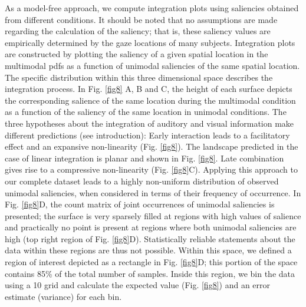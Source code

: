 As a model-free approach, we compute integration plots using saliencies
obtained from different conditions. It should be noted that no assumptions
are made regarding the calculation of the saliency; that is, these saliency
values are empirically determined by the gaze locations of many subjects.
Integration plots are constructed by plotting the saliency of a given
spatial location in the multimodal pdfs as a function of unimodal
saliencies of the same spatial location. The specific distribution within
this three dimensional space describes the integration process. In
Fig. \ref{fig8} A, B and C, the height of each surface depicts the corresponding
salience of the same location during the multimodal condition as a function
of the saliency of the same location in unimodal conditions. The three
hypotheses about the integration of auditory and visual information make
different predictions (see introduction): Early interaction leads to a
facilitatory effect and an expansive non-linearity (Fig. \ref{fig8}). The
landscape predicted in the case of linear integration is planar and shown
in Fig. \ref{fig8}. Late combination gives rise to a compressive non-linearity
(Fig. \ref{fig8}C). Applying this approach to our complete dataset leads to a
highly non-uniform distribution of observed unimodal saliencies, when
considered in terms of their frequency of occurrence. In Fig. \ref{fig8}D, the
count matrix of joint occurrences of unimodal saliencies is presented; the
surface is very sparsely filled at regions with high values of salience and
practically no point is present at regions where both unimodal saliencies
are high (top right region of Fig. \ref{fig8}D). Statistically reliable
statements about the data within these regions are thus not possible.
Within this space, we defined a region of interest depicted as a rectangle
in Fig. \ref{fig8}D; this portion of the space contains 85\% of the total number
of samples. Inside this region, we bin the data using a 10 
grid and calculate the expected value (Fig. \ref{fig8}) and an error estimate
(variance) for each bin. 

